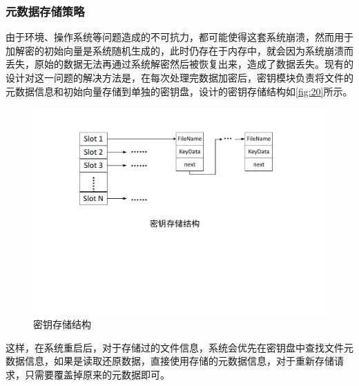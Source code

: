 \subsubsection{元数据存储策略}
由于环境、操作系统等问题造成的不可抗力，都可能使得这套系统崩溃，然而用于加解密的初始向量是系统随机生成的，此时仍存在于内存中，就会因为系统崩溃而丢失，原始的数据无法再通过系统解密然后被恢复出来，造成了数据丢失。现有的设计对这一问题的解决方法是，在每次处理完数据加密后，密钥模块负责将文件的元数据信息和初始向量存储到单独的密钥盘，设计的密钥存储结构如\autoref{fig:20}所示。
\begin{figure}[H]
	\centering
	\includegraphics[width=1\textwidth]{Pics/keystore.pdf}
	\caption{密钥存储结构}
	\label{fig:20}
\end{figure}
这样，在系统重启后，对于存储过的文件信息，系统会优先在密钥盘中查找文件元数据信息，如果是读取还原数据，直接使用存储的元数据信息，对于重新存储请求，只需要覆盖掉原来的元数据即可。
